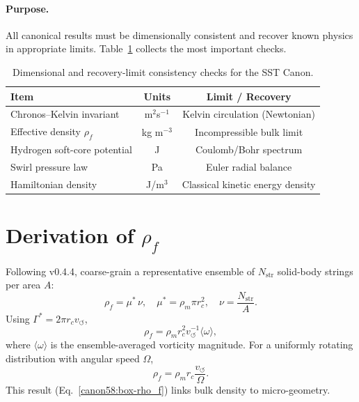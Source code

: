\documentclass[reprint,aps,onecolumn,nofootinbib]{revtex4-2}
\begin{document}
    \paragraph{Purpose.}
        All canonical results must be dimensionally consistent and recover
        known physics in appropriate limits. Table~\ref{canon58:dim-checks}
        collects the most important checks.
        \begin{table}[h!]
        \centering
        \begin{tabular}{|l|c|c|}
        \hline
        \textbf{Item} & \textbf{Units} & \textbf{Limit / Recovery} \\
        \hline
        Chronos--Kelvin invariant & m$^{2}$s$^{-1}$ & Kelvin circulation (Newtonian) \\
        Effective density $\rho_{\!f}$ & kg m$^{-3}$ & Incompressible bulk limit \\
        Hydrogen soft-core potential & J & Coulomb/Bohr spectrum \\
        Swirl pressure law & Pa & Euler radial balance \\
        Hamiltonian density & J/m$^{3}$ & Classical kinetic energy density \\
        \hline
        \end{tabular}
        \caption{Dimensional and recovery-limit consistency checks for the SST Canon.}
        \label{canon58:dim-checks}
        \end{table}

    \section{Derivation of $\rho_{\!f}$}
    \label{canon58:appC}
    Following v0.4.4, coarse-grain a representative ensemble of $N_{\mathrm{str}}$
    solid-body strings per area $A$:
    \[
        \rho_{\!f} = \mu^{*}\,\nu, \quad
        \mu^{*} = \rho_{\!m} \pi r_c^{2}, \quad
        \nu = \frac{N_{\mathrm{str}}}{A}.
    \]
    Using $\Gamma^{*} = 2\pi r_c v_{\!\boldsymbol{\circlearrowleft}}$,
    \[
        \rho_{\!f} = \rho_{\!m} r_c^{2} v_{\!\boldsymbol{\circlearrowleft}}^{-1} \langle \omega \rangle,
    \]
    where $\langle \omega \rangle$ is the ensemble-averaged vorticity magnitude.
    For a uniformly rotating distribution with angular speed $\Omega$,
    \[
        \rho_{\!f} = \rho_{\!m} r_c \frac{v_{\!\boldsymbol{\circlearrowleft}}}{\Omega}.
    \]
    This result (Eq.~\eqref{canon58:box-rho_f}) links bulk density to micro-geometry.
\end{document}
